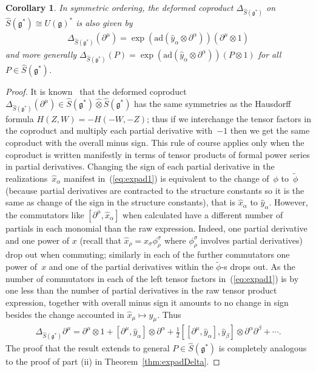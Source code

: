 \documentclass[10pt,a4paper]{amsart}
\def\gg{\mathfrak{g}}
\def\hx{\hat{x}}
\def\hy{\hat{y}}
\newtheorem{Corollary}[Theorem]{Corollary}
\numberwithin{equation}{section}
\begin{document}
\begin{Corollary}\label{cor:expady}
In symmetric ordering, the deformed coproduct $\Delta_{\hat{S}(\gg^*)}$ on
$\hat{S}(\gg^*)\cong U(\gg)^*$ is also given by
\begin{gather}\label{eq:expad2}
\Delta_{\hat{S}(\gg^*)}(\partial^\mu) = \exp(\mathrm{ad}(\hy_\alpha\otimes\partial^\alpha))
(\partial^\mu\otimes 1)
\end{gather}
and more generally $\Delta_{\hat{S}(\gg^*)}(P) = \exp(\mathrm{ad}(\hy_\alpha\otimes\partial^\alpha))(P\otimes 1)$ for all $P\in\hat{S}(\gg^*)$.
\end{Corollary}
\begin{proof} It is known~\cite{scopr} that the deformed coproduct $\Delta_{\hat{S}(\gg^*)}(\partial^\mu)\in \hat{S}(\gg^*)\hat\otimes\hat{S}(\gg^*)$ has the same symmetries as the Hausdorff formula $H(Z,W) = -H(-W,-Z)$; thus if we interchange the tensor factors in the coproduct and multiply each partial derivative with~$-1$ then we get the same coproduct with the overall minus sign. This rule of course applies only when the coproduct is written manifestly in terms of tensor products of formal power series in partial derivatives. Changing the sign of each partial derivative in the realizations~$\hat{x}_\alpha$ manifest in~(\ref{eq:expad1}) is equivalent to the change of~$\phi$ to~$\tilde\phi$ (because partial derivatives are contracted to the structure constants so it is the same as change of the sign in the structure constants), that is $\hat{x}_\alpha$ to $\hat{y}_\alpha$. However, the commutators like $[\partial^\mu,\hx_\alpha]$ when calculated have a different number of partials in each monomial than the raw expression. Indeed, one partial derivative and one power of $x$ (recall that $\hx_\rho = x_\sigma\phi^\sigma_\rho$ where $\phi^\sigma_\rho$ involves partial derivatives) drop out when commuting; similarly in each of the further commutators one power of~$x$ and one of the partial derivatives within the $\tilde\phi$-s drops out. As the number of commutators in each of the left tensor factors in~(\ref{eq:expad1}) is by one less than the number of partial derivatives in the raw tensor product expression, together with overall minus sign it amounts to no change in sign besides the change accounted in $\hx_\mu\mapsto\hy_\mu$. Thus
\begin{gather*} \Delta_{\hat{S}(\gg^*)} \partial^\mu = \partial^\mu\otimes 1 +
[\partial^\mu,\hat{y}_\alpha]\otimes \partial^\alpha + \frac{1}{2}
[[\partial^\mu,\hat{y}_\alpha],\hat{y}_\beta]\otimes \partial^\alpha\partial^\beta + \cdots.
\end{gather*}
The proof that the result extends to general $P\in\hat{S}(\gg^*)$ is completely analogous to the proof of part (ii) in Theorem~\ref{thm:expadDelta}.
\end{proof}
\end{document}
